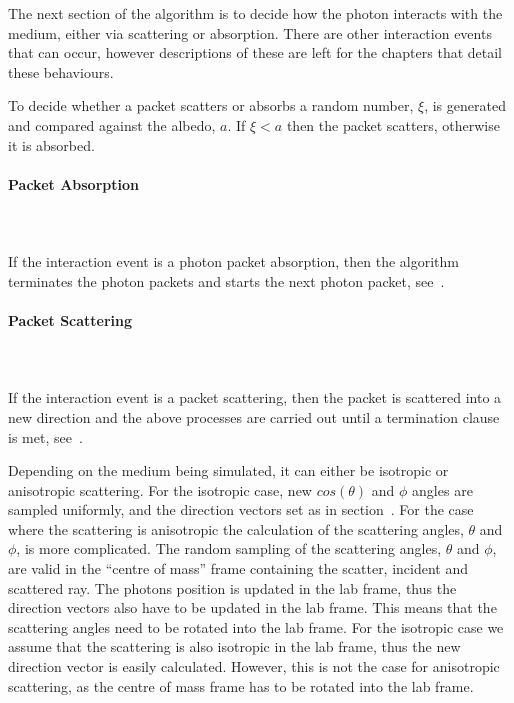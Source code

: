 The next section of the algorithm is to decide how the photon interacts with the medium, either via scattering or absorption. There are other interaction events that can occur, however descriptions of these are left for the chapters that detail these behaviours.
\medskip

To decide whether a packet scatters or absorbs a random number, $\xi$, is generated and compared against the albedo, $a$. 
If $\xi < a$ then the packet scatters, otherwise it is absorbed. 

\paragraph{Packet Absorption}\hspace{0pt}\\
\\
If the interaction event is a photon packet absorption, then the algorithm terminates the photon packets and starts the next photon packet, see~.

\paragraph{Packet Scattering}\hspace{0pt}\\
\\
If the interaction event is a packet scattering, then the packet is scattered into a new direction and the above processes are carried out until a termination clause is met, see~.

Depending on the medium being simulated, it can either be isotropic or anisotropic scattering. 
For the isotropic case, new $cos\left(\theta\right)$ and $\phi$ angles are sampled uniformly, and the direction vectors set as in section~.
For the case where the scattering is anisotropic the calculation of the scattering angles, $\theta$ and $\phi$, is more complicated.
The random sampling of the scattering angles, $\theta$ and $\phi$, are valid in the ``centre of mass'' frame containing the scatter, incident and scattered ray.
The photons position is updated in the lab frame, thus the direction vectors also have to be updated in the lab frame.
This means that the scattering angles need to be rotated into the lab frame.
For the isotropic case we assume that the scattering is also isotropic in the lab frame, thus the new direction vector is easily calculated.
However, this is not the case for anisotropic scattering, as the centre of mass frame has to be rotated into the lab frame.


